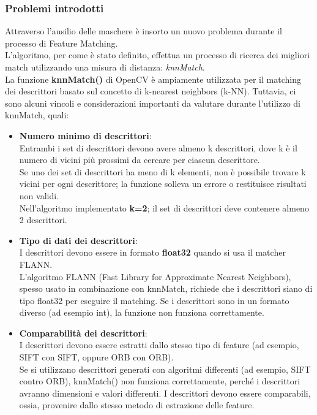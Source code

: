 \documentclass[12pt,a4paper,openright,twoside]{book}
\begin{document}
\subsubsection{Problemi introdotti}
Attraverso l'ausilio delle maschere è insorto un nuovo problema durante il processo di Feature Matching.\\
L'algoritmo, per come è stato definito, effettua un processo di ricerca dei migliori match utilizzando una misura di distanza: {\itshape knnMatch}.\\

La funzione \textbf{knnMatch()} di OpenCV è ampiamente utilizzata per il matching dei descrittori basato sul concetto di k-nearest neighbors (k-NN). Tuttavia, ci sono alcuni vincoli e considerazioni importanti da valutare durante l'utilizzo di knnMatch, quali:
\begin{itemize}
\item \textbf{Numero minimo di descrittori}:\\
Entrambi i set di descrittori devono avere almeno k descrittori, dove k è il numero di vicini più prossimi da cercare per ciascun descrittore.\\
Se uno dei set di descrittori ha meno di k elementi, non è possibile trovare k vicini per ogni descrittore; la funzione solleva un errore o restituisce risultati non validi. \\
Nell'algoritmo implementato \textbf{k=2}; il set di descrittori deve contenere almeno 2 descrittori.

\item \textbf{Tipo di dati dei descrittori}:\\
I descrittori devono essere in formato \textbf{float32} quando si usa il matcher FLANN.\\
L'algoritmo FLANN (Fast Library for Approximate Nearest Neighbors), spesso usato in combinazione con knnMatch, richiede che i descrittori siano di tipo float32 per eseguire il matching. Se i descrittori sono in un formato diverso (ad esempio int), la funzione non funziona correttamente.

\item \textbf{Comparabilità dei descrittori}:\\
I descrittori devono essere estratti dallo stesso tipo di feature (ad esempio, SIFT con SIFT, oppure ORB con ORB). \\
Se si utilizzano descrittori generati con algoritmi differenti (ad esempio, SIFT contro ORB), knnMatch() non funziona correttamente, perché i descrittori avranno dimensioni e valori differenti. I descrittori devono essere comparabili, ossia, provenire dallo stesso metodo di estrazione delle feature.

\end{itemize}
\end{document}
